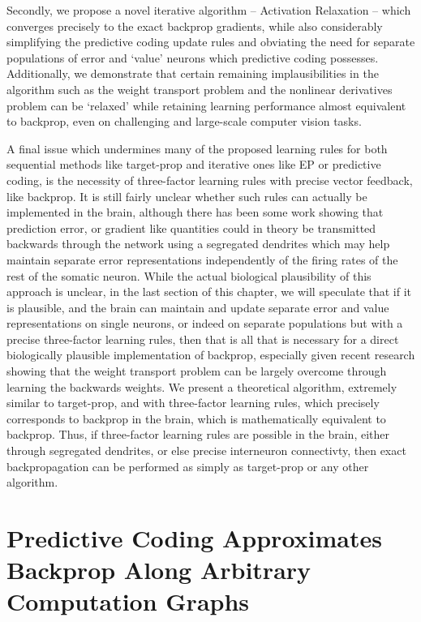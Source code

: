 Secondly, we propose a novel iterative algorithm -- Activation Relaxation \citep{millidge2020activation}-- which converges precisely to the exact backprop gradients, while also considerably simplifying the predictive coding update rules and obviating the need for separate populations of error and `value' neurons which predictive coding possesses. Additionally, we demonstrate that certain remaining implausibilities in the algorithm such as the weight transport problem and the nonlinear derivatives problem can be `relaxed' while retaining learning performance almost equivalent to backprop, even on challenging and large-scale computer vision tasks.

A final issue which undermines many of the proposed learning rules for both sequential methods like target-prop and iterative ones like EP or predictive coding, is the necessity of three-factor learning rules with precise vector feedback, like backprop. It is still fairly unclear whether such rules can actually be implemented in the brain, although there has been some work showing that prediction error, or gradient like quantities could in theory be transmitted backwards through the network using a segregated dendrites \citep{sacramento2018dendritic} which may help maintain separate error representations independently of the firing rates of the rest of the somatic neuron. While the actual biological plausibility of this approach is unclear, in the last section of this chapter, we will speculate that if it is plausible, and the brain can maintain and update separate error and value representations on single neurons, or indeed on separate populations but with a precise three-factor learning rules, then that is all that is necessary for a direct biologically plausible implementation of backprop, especially given recent research showing that the weight transport problem can be largely overcome through learning the backwards weights.  We present a theoretical algorithm, extremely similar to target-prop, and with three-factor learning rules, which precisely corresponds to backprop in the brain, which is mathematically equivalent to backprop. Thus, if three-factor learning rules are possible in the brain, either through segregated dendrites, or else precise interneuron connectivty, then exact backpropagation can be performed as simply as target-prop or any other algorithm.

\section{Predictive Coding Approximates Backprop Along Arbitrary Computation Graphs}

